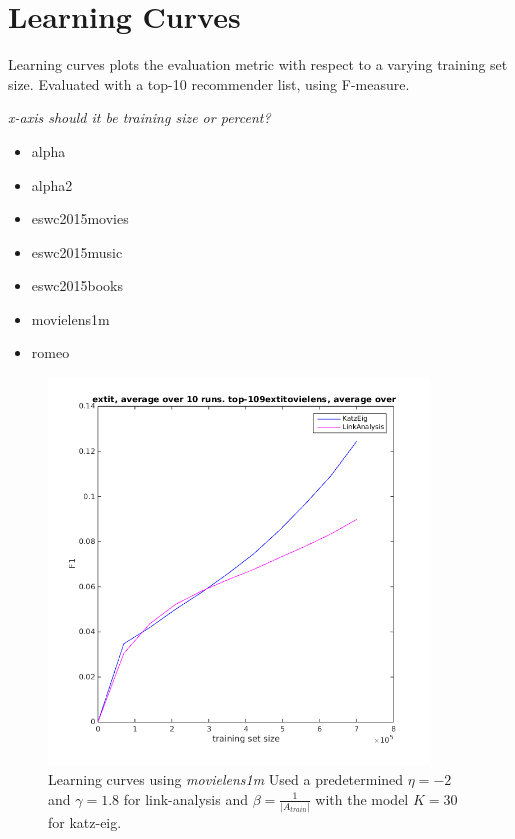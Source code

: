 
\section{Learning Curves}\label{sec:graphs:learning_curves}

Learning curves plots the evaluation metric with respect to a varying training set size. Evaluated with a top-10 recommender list, using F-measure.

\textit{x-axis should it be training size or percent?}

\begin{itemize}
    \item alpha
    \item alpha2
    \item eswc2015movies
    \item eswc2015music
    \item eswc2015books
    \item movielens1m
    \item romeo
\end{itemize}



\begin{figure}[ht]
  \centering
    \includegraphics[width=0.9\textwidth]{fig/learning_curves/movielens_learning_curves.png}
    \caption{Learning curves using \textit{movielens1m}
        Used a predetermined $\eta = -2$ and $\gamma = 1.8$ for link-analysis and $\beta = \frac{1}{|A_{train}|}$ with the model $K = 30$ for katz-eig.}
\end{figure}

